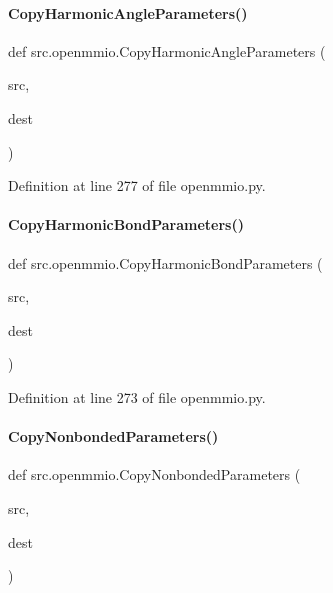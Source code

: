 \paragraph{\texorpdfstring{Copy\+Harmonic\+Angle\+Parameters()}{CopyHarmonicAngleParameters()}}
{\footnotesize\ttfamily def src.\+openmmio.\+Copy\+Harmonic\+Angle\+Parameters (\begin{DoxyParamCaption}\item[{}]{src,  }\item[{}]{dest }\end{DoxyParamCaption})}



Definition at line 277 of file openmmio.\+py.

\mbox{\label{namespacesrc_1_1openmmio_aac056cf25d1ae9d169117969690d3be2}} 
\paragraph{\texorpdfstring{Copy\+Harmonic\+Bond\+Parameters()}{CopyHarmonicBondParameters()}}
{\footnotesize\ttfamily def src.\+openmmio.\+Copy\+Harmonic\+Bond\+Parameters (\begin{DoxyParamCaption}\item[{}]{src,  }\item[{}]{dest }\end{DoxyParamCaption})}



Definition at line 273 of file openmmio.\+py.

\mbox{\label{namespacesrc_1_1openmmio_a839c303fbea5ec7b5241d5bd22a32066}} 
\paragraph{\texorpdfstring{Copy\+Nonbonded\+Parameters()}{CopyNonbondedParameters()}}
{\footnotesize\ttfamily def src.\+openmmio.\+Copy\+Nonbonded\+Parameters (\begin{DoxyParamCaption}\item[{}]{src,  }\item[{}]{dest }\end{DoxyParamCaption})}



